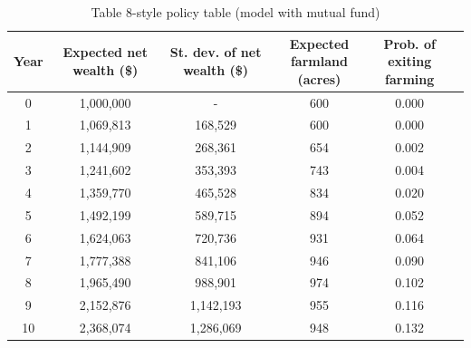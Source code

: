 \begin{table}
\caption{Table 8-style policy table (model with mutual fund)}
\label{tab:table8_mutual_makecell}
\begin{tabular}{cccccc}
\toprule
Year & \makecell{Expected net\\wealth (\$)} & \makecell{St. dev. of\\net wealth (\$)} & \makecell{Expected farmland\\(acres)} & \makecell{Prob. of exiting\\farming} \\
\midrule
0 & 1,000,000 & - & 600 & 0.000 \\
1 & 1,069,813 & 168,529 & 600 & 0.000 \\
2 & 1,144,909 & 268,361 & 654 & 0.002 \\
3 & 1,241,602 & 353,393 & 743 & 0.004 \\
4 & 1,359,770 & 465,528 & 834 & 0.020 \\
5 & 1,492,199 & 589,715 & 894 & 0.052 \\
6 & 1,624,063 & 720,736 & 931 & 0.064 \\
7 & 1,777,388 & 841,106 & 946 & 0.090 \\
8 & 1,965,490 & 988,901 & 974 & 0.102 \\
9 & 2,152,876 & 1,142,193 & 955 & 0.116 \\
10 & 2,368,074 & 1,286,069 & 948 & 0.132 \\
\bottomrule
\end{tabular}
\end{table}
